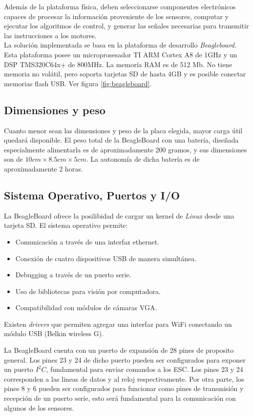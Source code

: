 \documentclass[main]{subfiles}
\begin{document}
Adem\'as de la plataforma f\'isica, deben seleccionarse componentes electr\'onicos capaces de procesar la informaci\'on proveniente de los sensores, computar y ejecutar los algoritmos de control, y generar las se\~nales necesarias para transmitir las instrucciones a los motores.\\

La soluci\'on implementada se basa en la plataforma de desarrollo \emph{Beagleboard}. Esta plataforma posee un microprosesador TI ARM Cortex A8 de 1GHz y un DSP TMS320C64x+ de 800MHz. La memor\'ia RAM es de 512 Mb. No tiene memoria no vol\'atil, pero soporta tarjetas SD de hasta 4GB y es posible conectar memorias flash USB. Ver figura \ref{fig:beagleboard}.

\subsection*{Dimensiones y peso}

Cuanto menor sean las dimensiones y peso de la placa elegida, mayor carga \'util quedar\'a disponible. El peso total de la BeagleBoard con una bater\'ia, diseñada especialmente alimentarla es de aproximadamente 200 gramos, y sus dimensiones son de $10cm\times8.5cm\times5cm$. La autonom\'ia de dicha bater\'ia es de aproximadamente 2 horas.

\subsection*{Sistema Operativo, Puertos y I/O}

La BeagleBoard ofrece la posilibidad de cargar un kernel de \emph{Linux} desde una tarjeta SD. El sistema operativo permite:
\begin{itemize}
\item Comunicaci\'on a trav\'es de una interfaz ethernet.
\item Conexi\'on de cuatro dispositivos USB de manera simult\'anea.
\item Debugging a trav\'es de un puerto serie.
\item Uso de bibliotecas para visi\'on por computadora. 
\item Compatibilidad con m\'odulos de c\'amaras VGA.
\end{itemize}

Existen \textit{drivers} que permiten agregar una interfaz para WiFi conectando un m\'odulo USB (Belkin wireless G).

La BeagleBoard cuenta con un puerto de expansi\'on de 28 pines de proposito general. Los pines 23 y 24 de dicho puerto pueden ser configurados para exponer un puerto $I^2C$, fundamental para enviar comandos a los ESC. Los pines 23 y 24 corresponden a las lineas de datos y al reloj respectivamente. Por otra parte, los pines 8 y 6 pueden ser configurados para funcionar como pines de transmisi\'on y recepci\'on de un puerto serie, esto ser\'a fundamental para la comunicaci\'on con algunos de los sensores.
\end{document}
